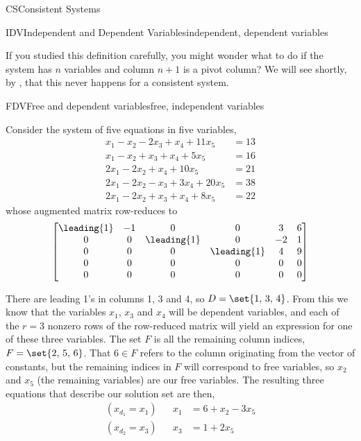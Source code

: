 \begin{subsect}{CS}{Consistent Systems}
\begin{definition}{IDV}{Independent and Dependent Variables}{independent, dependent variables}
\end{definition}
%
\begin{para}If you studied this definition carefully, you might wonder what to do if the system has $n$ variables and column $n+1$ is a pivot column?  We will see shortly, by , that this never happens for a consistent system.\end{para}
%
\begin{example}{FDV}{Free and dependent variables}{free, independent variables}
\begin{para}Consider the system of five equations in five variables,
%
\begin{align*}
 x_1  - x_2  -2 x_3 +  x_4 + 11 x_5 &= 13 \\
x_1 - x_2 +  x_3+  x_4 + 5 x_5 &= 16 \\
 2 x_1  -2 x_2       +  x_4 + 10 x_5 &= 21 \\
 2 x_1  -2 x_2  - x_3 + 3 x_4 + 20 x_5 &= 38 \\
 2 x_1  -2 x_ 2 +  x_3 +  x_4 + 8 x_ 5&= 22
\end{align*}
%
whose augmented matrix row-reduces to
%
\begin{equation*}
\begin{bmatrix}
 \leading{1} & -1 & 0 & 0 & 3 & 6 \\
 0 & 0 & \leading{1} & 0 & -2 & 1 \\
 0 & 0 & 0 & \leading{1} & 4 & 9 \\
 0 & 0 & 0 & 0 & 0 & 0 \\
 0 & 0 & 0 & 0 & 0 & 0
\end{bmatrix}
\end{equation*}
\end{para}
%
\begin{para}There are leading 1's in columns 1, 3 and 4, so $D=\set{1,\,3,\,4}$.  From this we know that the variables $x_1$, $x_3$ and $x_4$ will be dependent variables, and each of the $r=3$ nonzero rows of the row-reduced matrix will yield an expression for one of these three variables.  The set $F$ is all the remaining column indices, $F=\set{2,\,5,\,6}$.  That $6\in F$ refers to the column originating from the vector of constants, but the remaining indices in $F$ will correspond to free variables, so $x_2$ and $x_5$ (the remaining variables) are our free variables.  The resulting three equations that describe our solution set are then,
%
\begin{align*}
(x_{d_1}=x_1)& & x_1&=6+x_2-3x_5\\
(x_{d_2}=x_3)& & x_3&=1+2x_5\\

\end{align*}
\end{para}
\end{example}
\end{subsect}
